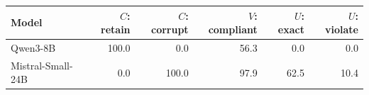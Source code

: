 \begin{tabular}{lrrrrr}
\toprule
Model & $C$: retain & $C$: corrupt & $V$: compliant & $U$: exact & $U$: violate \\
\midrule
Qwen3-8B & 100.0 & 0.0 & 56.3 & 0.0 & 0.0 \\
Mistral-Small-24B & 0.0 & 100.0 & 97.9 & 62.5 & 10.4 \\
\bottomrule
\end{tabular}
